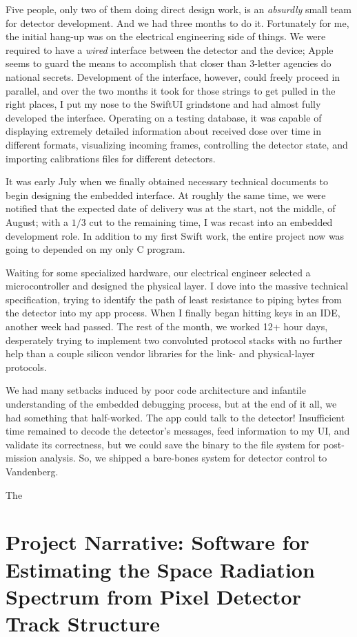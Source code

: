 \documentclass[12pt]{article}
\begin{document}
Five people, only two of them doing direct design work, is an \textit{absurdly} small team for detector development.
And we had three months to do it.
Fortunately for me, the initial hang-up was on the electrical engineering side of things.
We were required to have a \textit{wired} interface between the detector and the device;
Apple seems to guard the means to accomplish that closer than 3-letter agencies do national secrets.
Development of the interface, however, could freely proceed in parallel, and over the two months it took for those strings to get pulled in the right places,
I put my nose to the SwiftUI grindstone and had almost fully developed the interface.
Operating on a testing database, it was capable of displaying extremely detailed information about received dose over time in different formats,
visualizing incoming frames, controlling the detector state, and importing calibrations files for different detectors.

It was early July when we finally obtained necessary technical documents to begin designing the embedded interface.
At roughly the same time, we were notified that the expected date of delivery was at the start, not the middle, of August;
with a $1/3$ cut to the remaining time, I was recast into an embedded development role.
In addition to my first Swift work, the entire project now was going to depended on my only C program.

Waiting for some specialized hardware, our electrical engineer selected a microcontroller and designed the physical layer.
I dove into the massive technical specification, trying to identify the path of least resistance to piping bytes from the detector into my app process.
When I finally began hitting keys in an IDE, another week had passed.
The rest of the month, we worked 12+ hour days, desperately trying to implement two convoluted protocol stacks with no further help than a
couple silicon vendor libraries for the link- and physical-layer protocols.

We had many setbacks induced by poor code architecture and infantile understanding of the embedded debugging process,
but at the end of it all, we had something that half-worked.
The app could talk to the detector!
Insufficient time remained to decode the detector's messages, feed information to my UI, and validate its correctness,
but we could save the binary to the file system for post-mission analysis.
So, we shipped a bare-bones system for detector control to Vandenberg.

The
\newpage
\section*{Project Narrative: Software for Estimating the Space Radiation Spectrum from Pixel Detector Track Structure}
\end{document}
